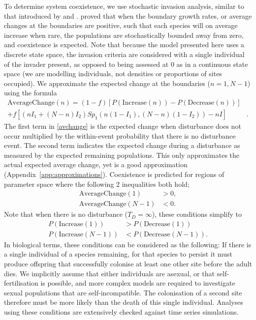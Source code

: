 \documentclass[a4paper]{article}
\begin{document}
To determine system coexistence, we use stochastic invasion analysis, similar to that introduced by \cite{chesson1989invasibility} and \cite{ellner1989convergence}. \cite{chesson1982stabilizing} proved that when the boundary growth rates, or average changes at the boundaries are positive, such that each species will on average increase when rare, the populations are stochastically bounded away from zero, and coexistence is expected.  Note that because the model presented here uses a discrete state space, the invasion criteria are considered with a single individual of the invader present, as opposed to being assessed at 0 as in a continuous state space (we are modelling individuals, not densities or proportions of sites occupied). We approximate the expected change at the boundaries ($n=1,N-1$) using the formula
\begin{equation}
\label{avchange}
\begin{array}{rl}
\text{AverageChange}(n) = (1-f)\left[P(\text{Increase}(n))-P(\text{Decrease}(n))\right]&\\[0.75em]
+ f\left[ (nI_1 + (N-n)I_2) Sp_1(n(1-I_1),(N-n)(1-I_2)) - nI\right]&.
\end{array}
\end{equation}
The first term in \eqref{avchange} is the expected change when disturbance does not occur multiplied by the within-event probability that there is no disturbance event. The second term indicates the expected change during a disturbance as measured by the expected remaining populations. This only approximates the actual expected average change, yet is a good approximation (Appendix~\ref{app:approximations}). Coexistence is predicted for regions of parameter space where the following 2 inequalities both hold;
\begin{align}
\label{ac1}\text{AverageChange}(1)&>0, \\
\label{acn-1}\text{AverageChange}(N-1)&<0. \end{align}
Note that when there is no disturbance ($T_D=\infty$), these conditions simplify to 
\begin{align}
\label{lowerboundarycond}P(\text{Increase}(1))&>P(\text{Decrease}(1)) \\
\label{upperboundarycond}P(\text{Increase}(N-1))&<P(\text{Decrease}(N-1)). \end{align}
In biological terms, these conditions can be considered as the following: If there is a single individual of a species remaining, for that species to persist it must produce offspring that successfully colonise at least one other site before the adult dies. We implicitly assume that either individuals are asexual, or that self-fertilisation is possible, and more complex models are required to investigate sexual populations that are self-incompatible. The colonisation of a second site therefore must be more likely than the death of this single individual. Analyses using these conditions are extensively checked against time series simulations.
\end{document}
